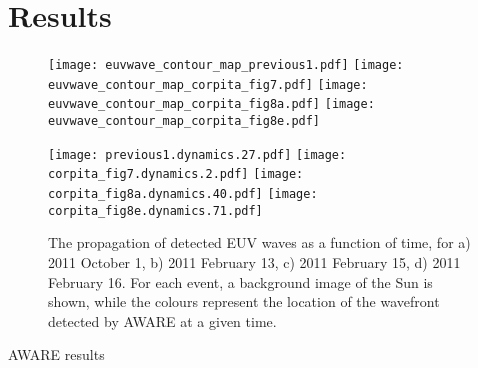 \section{Results}\label{sec:results}


\begin{figure}
\begin{center}
\texttt{[image: euvwave\_contour\_map\_previous1.pdf]}
\texttt{[image: euvwave\_contour\_map\_corpita\_fig7.pdf]}
\texttt{[image: euvwave\_contour\_map\_corpita\_fig8a.pdf]}
\texttt{[image: euvwave\_contour\_map\_corpita\_fig8e.pdf]}

\texttt{[image: previous1.dynamics.27.pdf]}
\texttt{[image: corpita\_fig7.dynamics.2.pdf]}
\texttt{[image: corpita\_fig8a.dynamics.40.pdf]}
\texttt{[image: corpita\_fig8e.dynamics.71.pdf]}
\caption{The propagation of detected EUV waves as a function of time, for a) 2011 October 1, b) 2011 February 13, c) 2011 February 15, d) 2011 February 16. For each event, a background image of the Sun is shown, while the colours represent the location of the wavefront detected by AWARE at a given time.}
\end{center}
\end{figure}

AWARE results
